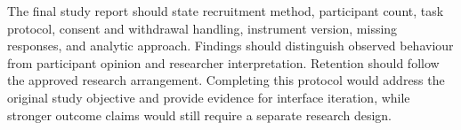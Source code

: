 The final study report should state recruitment method, participant count, task protocol, consent and withdrawal handling, instrument version, missing responses, and analytic approach. Findings should distinguish observed behaviour from participant opinion and researcher interpretation. Retention should follow the approved research arrangement. Completing this protocol would address the original study objective and provide evidence for interface iteration, while stronger outcome claims would still require a separate research design.

